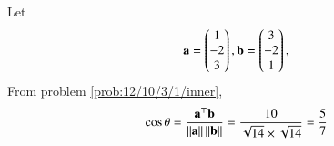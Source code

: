 Let 
\begin{align}
	\mathbf{a} = \begin{pmatrix}1\\-2\\3\end{pmatrix} , \mathbf{b} = \begin{pmatrix}3\\ -2 \\ 1\end{pmatrix},
\end{align}
		From problem \ref{prob:12/10/3/1/inner},
\begin{align}
\cos\theta=\frac{\mathbf{a}^{\top}\mathbf{b}}{\left\lVert\mathbf{a}\right\rVert\left\lVert\mathbf{b}\right\rVert}
	= \frac{10}{\sqrt{14}\times \sqrt{14}}= \frac{5}{7}
\end{align}
